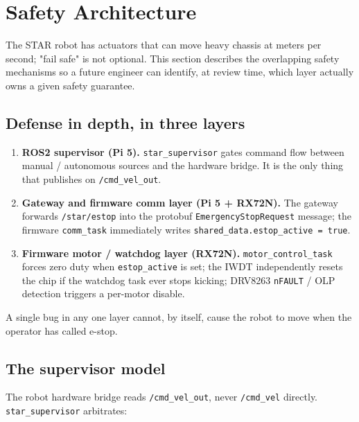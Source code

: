
\section{Safety Architecture}
\label{section:safety-architecture}

The STAR robot has actuators that can move heavy chassis at meters
per second; "fail safe" is not optional. This section describes the
overlapping safety mechanisms so a future engineer can identify, at
review time, which layer actually owns a given safety guarantee.

\subsection{Defense in depth, in three layers}

\begin{enumerate}
  \item \textbf{ROS2 supervisor (Pi 5).} \texttt{star\_supervisor}
        gates command flow between manual / autonomous sources and
        the hardware bridge. It is the only thing that publishes on
        \texttt{/cmd\_vel\_out}.
  \item \textbf{Gateway and firmware comm layer (Pi 5 + RX72N).} The
        gateway forwards \texttt{/star/estop} into the protobuf
        \texttt{EmergencyStopRequest} message; the firmware
        \texttt{comm\_task} immediately writes
        \texttt{shared\_data.estop\_active = true}.
  \item \textbf{Firmware motor / watchdog layer (RX72N).}
        \texttt{motor\_control\_task} forces zero duty when
        \texttt{estop\_active} is set; the IWDT independently resets
        the chip if the watchdog task ever stops kicking; DRV8263
        \texttt{nFAULT} / OLP detection triggers a per-motor disable.
\end{enumerate}

A single bug in any one layer cannot, by itself, cause the robot to
move when the operator has called e-stop.

\subsection{The supervisor model}

The robot hardware bridge reads \texttt{/cmd\_vel\_out}, never
\texttt{/cmd\_vel} directly. \texttt{star\_supervisor} arbitrates:

